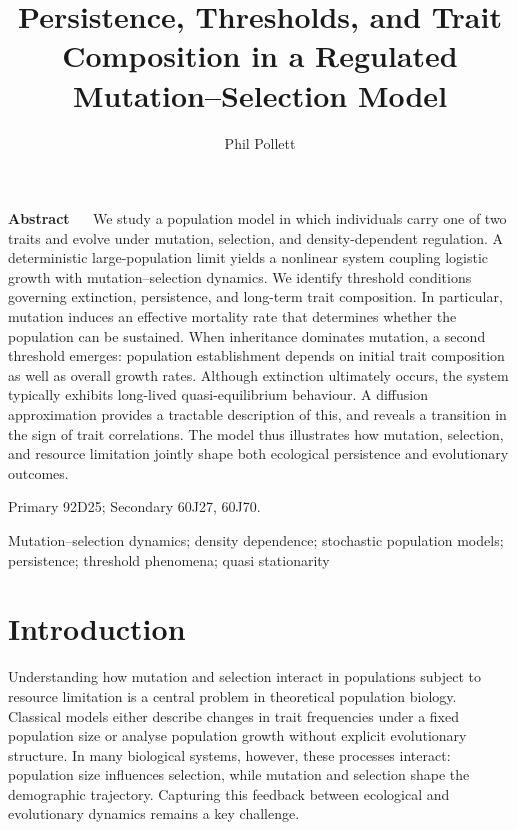 \documentclass[12pt]{article}
\title{Persistence, Thresholds, and Trait Composition in a Regulated
Mutation--Selection Model}
\author{Phil Pollett}
\begin{document}
\maketitle

\begin{center}
\begin{minipage}{14cm}
{\bf Abstract} \ \ 
{\setlength{\parindent}{1.5em}
We study a population model in which individuals carry one of two traits
and evolve under mutation, selection, and density-dependent regulation.
A deterministic large-population limit yields a nonlinear system
coupling logistic growth with mutation–selection dynamics. We identify
threshold conditions governing extinction, persistence, and long-term
trait composition. In particular, mutation induces an effective
mortality rate that determines whether the population can be sustained.
When inheritance dominates mutation, a second threshold emerges:
population establishment depends on initial trait composition as well as
overall growth rates. Although extinction ultimately occurs, the system
typically exhibits long-lived quasi-equilibrium behaviour. A diffusion
approximation provides a tractable description of this, and
reveals a transition in the sign of trait correlations. The model thus
illustrates how mutation, selection, and resource limitation jointly
shape both ecological persistence and evolutionary outcomes.
}
\end{minipage}
\end{center}

\smallskip
{} Primary 92D25; Secondary 60J27, 60J70.

\medskip
{} Mutation–selection dynamics; density
dependence; stochastic population models; persistence; threshold
phenomena; quasi stationarity

\section{Introduction}

Understanding how mutation and selection interact in populations subject
to resource limitation is a central problem in theoretical population
biology. Classical models either describe changes in trait frequencies
under a fixed population size or analyse population growth without
explicit evolutionary structure. In many biological systems, however,
these processes interact: population size influences selection,
while mutation and selection shape the demographic trajectory. Capturing
this feedback between ecological and evolutionary dynamics remains a key
challenge.
\end{document}
